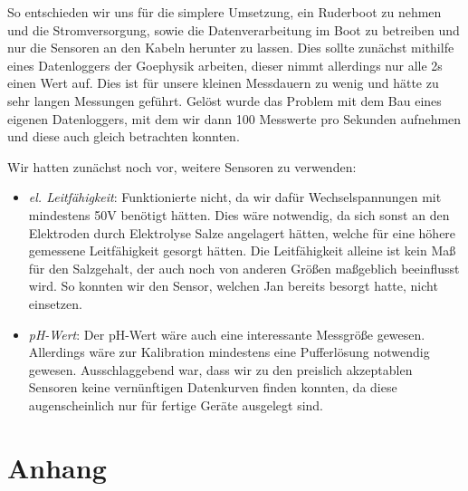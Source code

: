 \documentclass[12pt,a4paper,titlepage,headinclude,bibtotoc]{scrartcl}
\numberwithin{equation}{subsection}
\begin{document}
So entschieden wir uns für die simplere Umsetzung, ein Ruderboot zu nehmen und die Stromversorgung, sowie die Datenverarbeitung im Boot zu betreiben und nur die Sensoren an den Kabeln herunter zu lassen.
Dies sollte zunächst mithilfe eines Datenloggers der Goephysik arbeiten, dieser nimmt allerdings nur alle 2\si{\second} einen Wert auf.
Dies ist für unsere kleinen Messdauern zu wenig und hätte zu sehr langen Messungen geführt.
Gelöst wurde das Problem mit dem Bau eines eigenen Datenloggers, mit dem wir dann 100 Messwerte pro Sekunden aufnehmen und diese auch gleich betrachten konnten.


Wir hatten zunächst noch vor, weitere Sensoren zu verwenden:
\begin{itemize}
	\item \textit{el. Leitfähigkeit}: Funktionierte nicht, da wir dafür Wechselspannungen mit mindestens 50V benötigt hätten.
		Dies wäre notwendig, da sich sonst an den Elektroden durch Elektrolyse Salze angelagert hätten, welche für eine höhere gemessene Leitfähigkeit gesorgt hätten.
		Die Leitfähigkeit alleine ist kein Maß für den Salzgehalt, der auch noch von anderen Größen maßgeblich beeinflusst wird.
		So konnten wir den Sensor, welchen Jan bereits besorgt hatte, nicht einsetzen.
	\item \textit{pH-Wert}: Der pH-Wert wäre auch eine interessante Messgröße gewesen.
		Allerdings wäre zur Kalibration mindestens eine Pufferlösung notwendig gewesen.
		Ausschlaggebend war, dass wir zu den preislich akzeptablen Sensoren keine vernünftigen Datenkurven finden konnten, da diese augenscheinlich nur für fertige Geräte ausgelegt sind.
\end{itemize}

\newpage
\thispagestyle{empty}
\printbibliography[heading=bibintoc]
%
%
\newpage

\appendix
\section{Anhang}
\end{document}
